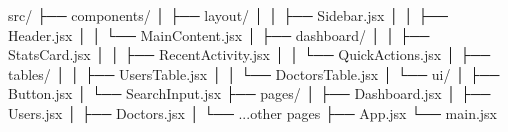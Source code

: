 src/
├── components/
│   ├── layout/
│   │   ├── Sidebar.jsx
│   │   ├── Header.jsx
│   │   └── MainContent.jsx
│   ├── dashboard/
│   │   ├── StatsCard.jsx
│   │   ├── RecentActivity.jsx
│   │   └── QuickActions.jsx
│   ├── tables/
│   │   ├── UsersTable.jsx
│   │   └── DoctorsTable.jsx
│   └── ui/
│       ├── Button.jsx
│       └── SearchInput.jsx
├── pages/
│   ├── Dashboard.jsx
│   ├── Users.jsx
│   ├── Doctors.jsx
│   └── ...other pages
├── App.jsx
└── main.jsx